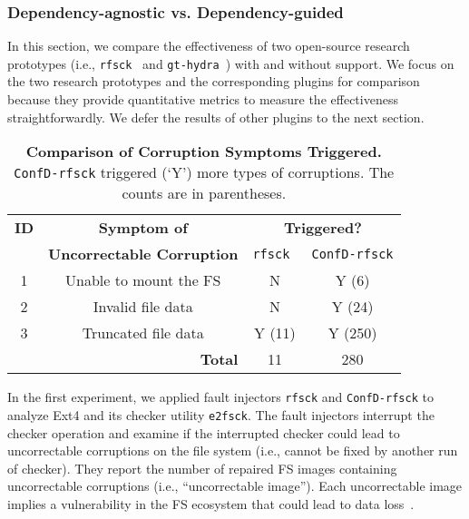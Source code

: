 \subsubsection{Dependency-agnostic vs. Dependency-guided}
\label{sec:dependency-aware-vs-agnostic}

In this section, we compare the effectiveness of two open-source research prototypes (i.e.,  \texttt{rfsck}~\cite{OmFAST18} and \texttt{gt-hydra}~\cite{hydra-2019}) with and without  \prj support. We focus on the two research prototypes and the corresponding plugins for   comparison   because they provide quantitative metrics to measure the effectiveness straightforwardly. We defer the results of other plugins to the next section. 

\begin{table}[t]
	\small
	\begin{center}
		\begin{tabular}{ c| c | c | c    }
 \textbf{ID} &	\textbf{Symptom of  }  &  \multicolumn{2}{c}{\textbf{Triggered?}}    \\
          \cline{3-4}
          & 	\textbf{Uncorrectable Corruption   }  & {\texttt{\space \space rfsck \space \space}}  & {{\texttt{ConfD-rfsck}}  }    \\
\hline
1  & Unable to mount the FS & N  &  Y  (6) \\
			\hline
2  & Invalid file data  & N  &  Y  (24) \\
			\hline
3  & Truncated file data  & Y (11) &  Y (250)   \\
			\hline
\multicolumn{2}{r|}{\textbf{Total}} & 11  &  280    \\
			\hline
		\end{tabular}
	\end{center}
	\caption{ {\bf Comparison of Corruption Symptoms Triggered.} 
\texttt{ConfD-rfsck} triggered (`Y') more types of corruptions. The counts are in parentheses.
}
	\label{tab:result-rfsck-symptom}
\end{table}



In the first experiment, we applied fault injectors \texttt{rfsck}  and \texttt{ConfD-rfsck} to analyze Ext4 and its checker utility \texttt{e2fsck}. The fault injectors  interrupt the checker operation and examine if the interrupted checker   could lead to uncorrectable corruptions on the file system (i.e., cannot be fixed by another run of checker). They report the number of repaired FS images containing uncorrectable corruptions (i.e., ``uncorrectable image''). Each uncorrectable image implies a vulnerability in the FS ecosystem that could lead to data loss~\cite{OmFAST18}.  

